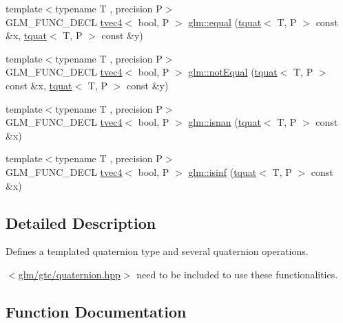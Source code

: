 \begin{DoxyCompactItemize}
{\footnotesize template$<$typename T , precision P$>$ }\\G\+L\+M\+\_\+\+F\+U\+N\+C\+\_\+\+D\+E\+CL \hyperlink{structglm_1_1tvec4}{tvec4}$<$ bool, P $>$ \hyperlink{group__gtc__quaternion_gac187115710365e0b2902220b9611e7b6}{glm\+::equal} (\hyperlink{structglm_1_1tquat}{tquat}$<$ T, P $>$ const \&x, \hyperlink{structglm_1_1tquat}{tquat}$<$ T, P $>$ const \&y)
\item 
{\footnotesize template$<$typename T , precision P$>$ }\\G\+L\+M\+\_\+\+F\+U\+N\+C\+\_\+\+D\+E\+CL \hyperlink{structglm_1_1tvec4}{tvec4}$<$ bool, P $>$ \hyperlink{group__gtc__quaternion_ga484c4633f7c05d8e29ee8b452350f539}{glm\+::not\+Equal} (\hyperlink{structglm_1_1tquat}{tquat}$<$ T, P $>$ const \&x, \hyperlink{structglm_1_1tquat}{tquat}$<$ T, P $>$ const \&y)
\item 
{\footnotesize template$<$typename T , precision P$>$ }\\G\+L\+M\+\_\+\+F\+U\+N\+C\+\_\+\+D\+E\+CL \hyperlink{structglm_1_1tvec4}{tvec4}$<$ bool, P $>$ \hyperlink{group__gtc__quaternion_gad2fc52dd4ba5ff79cc56b3e0f9c092ed}{glm\+::isnan} (\hyperlink{structglm_1_1tquat}{tquat}$<$ T, P $>$ const \&x)
\item 
{\footnotesize template$<$typename T , precision P$>$ }\\G\+L\+M\+\_\+\+F\+U\+N\+C\+\_\+\+D\+E\+CL \hyperlink{structglm_1_1tvec4}{tvec4}$<$ bool, P $>$ \hyperlink{group__gtc__quaternion_ga0a850f06736d25887536d0da88e63c70}{glm\+::isinf} (\hyperlink{structglm_1_1tquat}{tquat}$<$ T, P $>$ const \&x)
\end{DoxyCompactItemize}


\subsection{Detailed Description}
Defines a templated quaternion type and several quaternion operations. 

$<$\hyperlink{gtc_2quaternion_8hpp}{glm/gtc/quaternion.\+hpp}$>$ need to be included to use these functionalities. 

\subsection{Function Documentation}
\mbox{\label{group__gtc__quaternion_gad4a4448baedb198b2b1e7880d2544dc9}} 
